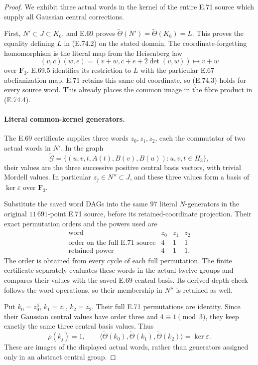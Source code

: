 \begin{proof}
We exhibit three actual words in the kernel of the entire E.71
source which supply all Gaussian central corrections.

First, $N'\subset J\subset K_6$, and E.69 proves
$\widetilde\Theta(N')=\widetilde\Theta(K_6)=L$.
This proves the equality defining $L$ in (E.74.2) on the stated
domain. The coordinate-forgetting homomorphism is the literal
map from the Heisenberg law
\[
 (v,c)(w,e)=(v+w,c+e+2\det(v,w))
       \longmapsto v+w
 \tag{E.74.6}
\]
over $\mathbf F_3$. E.69.5 identifies its restriction to $L$
with the particular E.67 abelianization map. E.71 retains this
same old coordinate, so (E.74.3) holds for every source word.
This already places the common image in the fibre product in
(E.74.4).

\paragraph{Literal common-kernel generators.}
The E.69 certificate supplies three words $z_0,z_1,z_2$, each
the commutator of two actual words in $N'$. In the graph
\[
 \widetilde{\mathcal G}
   =\{(u,v,t,A(t),B(v),B(u)):u,v,t\in H_3\},
 \tag{E.74.7}
\]
their values are the three successive positive central basis
vectors, with trivial Mordell values. In particular
$z_j\in N''\subset J$, and these three values form a basis of
$\ker\varepsilon$ over $\mathbf F_3$.

Substitute the saved word DAGs into the same $97$ literal
$N$-generators in the original $11\,691$-point E.71 source,
before its retained-coordinate projection. Their exact
permutation orders and the powers used are
\[
\begin{array}{c|ccc}
 \text{word}&z_0&z_1&z_2\\ \hline
 \text{order on the full E.71 source}&4&1&1\\
 \text{retained power}&4&1&1.
\end{array}
 \tag{E.74.8}
\]
The order is obtained from every cycle of each full permutation.
The finite certificate separately evaluates these words in the
actual twelve groups and compares their values with the saved
E.69 central basis. Its derived-depth check follows the word
operations, so their membership in $N''$ is retained as well.

Put $k_0=z_0^4$, $k_1=z_1$, $k_2=z_2$.
Their full E.71 permutations are identity. Since their Gaussian
central values have order three and $4\equiv1\pmod3$, they keep
exactly the same three central basis values. Thus
\[
 \rho(k_j)=1,\qquad
 \langle\widetilde\Theta(k_0),
          \widetilde\Theta(k_1),
          \widetilde\Theta(k_2)\rangle=\ker\varepsilon.
 \tag{E.74.9}
\]
These are images of the displayed actual words, rather than
generators assigned only in an abstract central group.


\end{proof}
